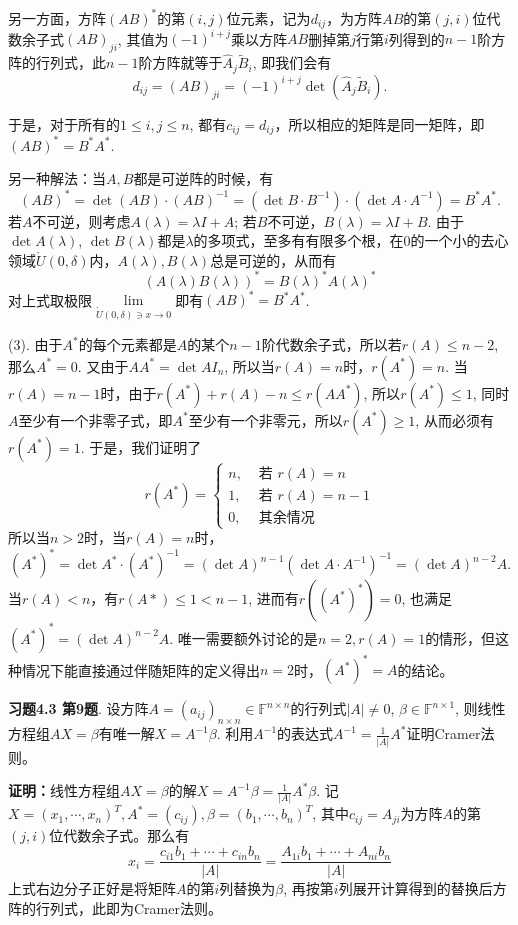 另一方面，方阵$(AB)^*$的第$(i,j)$位元素，记为$d_{ij}$，为方阵$AB$的第$(j,i)$位代数余子式$(AB)_{ji}$, 其值为$(-1)^{i+j}$乘以方阵$AB$删掉第$j$行第$i$列得到的$n-1$阶方阵的行列式，此$n-1$阶方阵就等于$\widehat{A}_j \widetilde{B}_i$, 即我们会有
$$d_{ij} = (AB)_{ji} = (-1)^{i+j} \det(\widehat{A}_j \widetilde{B}_i).$$

于是，对于所有的$1\leqslant i,j \leqslant n$, 都有$c_{ij} = d_{ij}$，所以相应的矩阵是同一矩阵，即$(AB)^* = B^*A^*$.

另一种解法：当$A,B$都是可逆阵的时候，有
$$(AB)^* = \det(AB) \cdot (AB)^{-1} = (\det B \cdot B^{-1}) \cdot (\det A \cdot A^{-1}) = B^*A^*.$$
若$A$不可逆，则考虑$A(\lambda) = \lambda I + A$; 若$B$不可逆，$B(\lambda) = \lambda I + B$. 由于$\det A(\lambda)$, $\det B(\lambda)$都是$\lambda$的多项式，至多有有限多个根，在$0$的一个小的去心领域$\mathring{U}(0,\delta)$内，$A(\lambda), B(\lambda)$总是可逆的，从而有
$$(A(\lambda)B(\lambda))^* = B(\lambda)^*A(\lambda)^*$$
对上式取极限$\lim\limits_{\mathring{U}(0,\delta) \ni x\to 0}$即有$(AB)^* = B^*A^*$.

(3). 由于$A^*$的每个元素都是$A$的某个$n-1$阶代数余子式，所以若$r(A)\leqslant n-2$, 那么$A^* = 0$. 又由于$AA^* = \det A I_n$, 所以当$r(A) = n$时，$r(A^*) = n$. 当$r(A) = n-1$时，由于$r(A^*) + r(A) - n \leqslant r(AA^*)$, 所以$r(A^*) \leqslant 1$, 同时$A$至少有一个非零子式，即$A^*$至少有一个非零元，所以$r(A^*) \geqslant 1$, 从而必须有$r(A^*) = 1$. 于是，我们证明了
$$r(A^*) = \begin{cases} n, & \text{ 若 } r(A) = n \\ 1, & \text{ 若 } r(A) = n-1 \\ 0, & \text{ 其余情况} \end{cases}$$
所以当$n > 2$时，当$r(A) = n$时，
$$(A^*)^* = \det A^* \cdot (A^*)^{-1} = (\det A)^{n-1} (\det A \cdot A^{-1})^{-1} = (\det A)^{n-2} A.$$
当$r(A) < n$，有$r(A*) \leqslant 1 < n-1$, 进而有$r((A^*)^*) = 0$, 也满足$(A^*)^* = (\det A)^{n-2}A$. 唯一需要额外讨论的是$n=2, r(A) = 1$的情形，但这种情况下能直接通过伴随矩阵的定义得出$n = 2$时，$(A^*)^* = A$的结论。

\newpageorvspace

{\bf 习题4.3 第9题}. 设方阵$A = (a_{ij})_{n\times n} \in \mathbb{F}^{n\times n}$的行列式$|A| \neq 0$, $\beta\in\mathbb{F}^{n\times 1}$, 则线性方程组$AX=\beta$有唯一解$X = A^{-1}\beta$. 利用$A^{-1}$的表达式$A^{-1} = \frac{1}{|A|}A^*$证明Cramer法则。

{\bf 证明：}线性方程组$AX=\beta$的解$X = A^{-1}\beta = \frac{1}{|A|}A^*\beta$. 记$X = (x_1, \cdots, x_n)^T, A^* = (c_{ij}), \beta = (b_1, \cdots, b_n)^T$, 其中$c_{ij} = A_{ji}$为方阵$A$的第$(j,i)$位代数余子式。那么有
$$x_i = \frac{c_{i1}b_1 + \cdots + c_{in}b_n}{|A|} = \frac{A_{1i}b_1 + \cdots + A_{ni}b_n}{|A|}$$
上式右边分子正好是将矩阵$A$的第$i$列替换为$\beta$, 再按第$i$列展开计算得到的替换后方阵的行列式，此即为Cramer法则。

